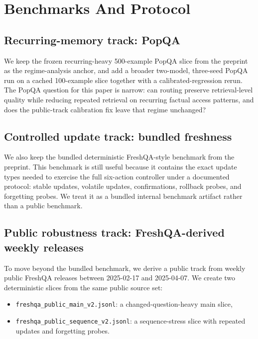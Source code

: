 \section{Benchmarks And Protocol}

\subsection{Recurring-memory track: PopQA}

We keep the frozen recurring-heavy 500-example PopQA slice from the preprint as the regime-analysis anchor, and add a broader two-model, three-seed PopQA run on a cached 100-example slice together with a calibrated-regression rerun. The PopQA question for this paper is narrow: can routing preserve retrieval-level quality while reducing repeated retrieval on recurring factual access patterns, and does the public-track calibration fix leave that regime unchanged?

\subsection{Controlled update track: bundled freshness}

We also keep the bundled deterministic FreshQA-style benchmark from the preprint. This benchmark is still useful because it contains the exact update types needed to exercise the full six-action controller under a documented protocol: stable updates, volatile updates, confirmations, rollback probes, and forgetting probes. We treat it as a bundled internal benchmark artifact rather than a public benchmark.

\subsection{Public robustness track: FreshQA-derived weekly releases}

To move beyond the bundled benchmark, we derive a public track from weekly public FreshQA releases between 2025-02-17 and 2025-04-07. We create two deterministic slices from the same public source set:
\begin{itemize}[leftmargin=1.5em]
\item \texttt{freshqa\_public\_main\_v2.jsonl}: a changed-question-heavy main slice,
\item \texttt{freshqa\_public\_sequence\_v2.jsonl}: a sequence-stress slice with repeated updates and forgetting probes.
\end{itemize}


